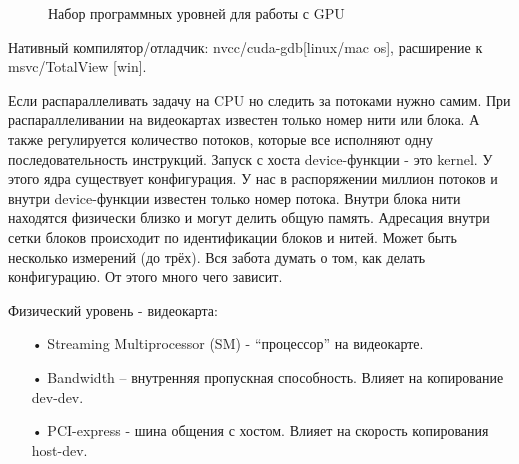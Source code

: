 \documentclass[a4paper,14pt,russian]{extreport}
\begin{document}
\begin{figure}[h]
\caption{Набор программных уровней для работы с GPU}
\label{ris:cuda_levels}
\end{figure}
\par
Нативный компилятор/отладчик: nvcc/cuda-gdb[linux/mac os], расширение к msvc/TotalView [win].
\par
Если распараллеливать задачу на CPU но следить за потоками нужно самим. При распараллеливании на видеокартах известен только номер нити или блока. А также регулируется количество потоков, которые все исполняют одну последовательность инструкций. Запуск с хоста device-функции - это kernel. У этого ядра существует конфигурация. У нас в распоряжении миллион потоков и внутри device-функции известен только номер потока. Внутри блока нити находятся физически близко и могут делить общую память. Адресация внутри сетки блоков происходит по идентификации блоков и нитей. Может быть несколько измерений (до трёх). Вся забота думать о том, как делать конфигурацию. От этого много чего зависит.
\par
Физический уровень - видеокарта:
\begin{itemize}
\item[•] Streaming Multiprocessor (SM) - “процессор” на видеокарте.
\item[•] Bandwidth – внутренняя пропускная способность. Влияет на копирование dev-dev.
\item[•] PCI-express - шина общения с хостом. Влияет на скорость копирования host-dev.
\end{itemize}
\end{document}
